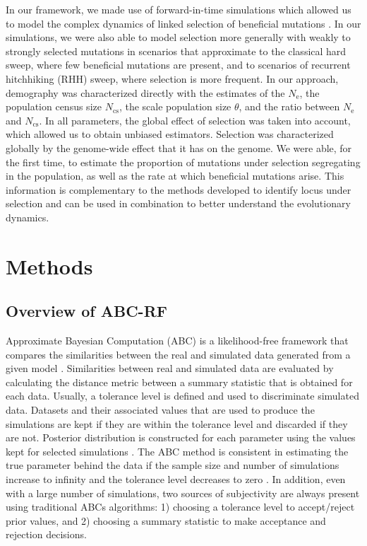 \documentclass[a4paper, 12pt]{article}
\begin{document}
In our framework, we made use of forward-in-time simulations which allowed us to model the complex dynamics of linked selection of beneficial mutations \citep{Haller:2017gm}. In our simulations, we were also able to model selection more generally with weakly to strongly selected mutations in scenarios that approximate to the classical hard sweep, where few beneficial mutations are present, and to scenarios of recurrent hitchhiking (RHH) sweep, where selection is more frequent. In our approach, demography was characterized directly with the estimates of the $N_{\mathrm{e}}$, the population census size $N_{\mathrm{cs}}$, the scale population size $\theta$, and the ratio between $N_{\mathrm{e}}$ and $N_{\mathrm{cs}}$. In all parameters, the global effect of selection was taken into account, which allowed us to obtain unbiased estimators. Selection was characterized globally by the genome-wide effect that it has on the genome. We were able, for the first time, to estimate the proportion of mutations under selection segregating in the population, as well as the rate at which beneficial mutations arise. This information is complementary to the methods developed to identify locus under selection and can be used in combination to better understand the evolutionary dynamics.

\section*{Methods}
\subsection*{Overview of ABC-RF}
Approximate Bayesian Computation (ABC) is a likelihood-free framework that compares the similarities between the real and simulated data generated from a given model \citep{Beaumont:2002ue}. Similarities between real and simulated data are evaluated by calculating the distance metric between a summary statistic that is obtained for each data. Usually, a tolerance level is defined and used to discriminate simulated data. Datasets and their associated values that are used to produce the simulations are kept if they are within the tolerance level and discarded if they are not. Posterior distribution is constructed for each parameter using the values kept for selected simulations \citep{Beaumont:2010gg}. The ABC method is consistent in estimating the true parameter behind the data if the sample size and number of simulations increase to infinity and the tolerance level decreases to zero  \citep{Frazier:2018kq}. In addition, even with a large number of simulations, two sources of subjectivity are always present using traditional ABCs algorithms: 1) choosing a tolerance level to accept/reject prior values, and 2) choosing a summary statistic to make acceptance and rejection decisions. 
\end{document}
